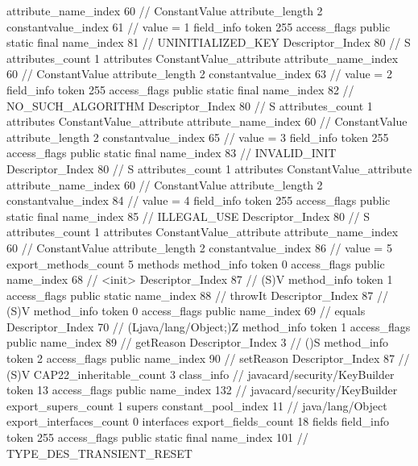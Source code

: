 {{{{{{{					attribute_name_index	60		// ConstantValue
					attribute_length	2
					constantvalue_index	61		// value = 1
				}
				}
			}
			field_info {
				token	255
				access_flags	public static final
				name_index	81		// UNINITIALIZED_KEY
				Descriptor_Index	80		// S
				attributes_count	1
				attributes {
				ConstantValue_attribute {
					attribute_name_index	60		// ConstantValue
					attribute_length	2
					constantvalue_index	63		// value = 2
				}
				}
			}
			field_info {
				token	255
				access_flags	public static final
				name_index	82		// NO_SUCH_ALGORITHM
				Descriptor_Index	80		// S
				attributes_count	1
				attributes {
				ConstantValue_attribute {
					attribute_name_index	60		// ConstantValue
					attribute_length	2
					constantvalue_index	65		// value = 3
				}
				}
			}
			field_info {
				token	255
				access_flags	public static final
				name_index	83		// INVALID_INIT
				Descriptor_Index	80		// S
				attributes_count	1
				attributes {
				ConstantValue_attribute {
					attribute_name_index	60		// ConstantValue
					attribute_length	2
					constantvalue_index	84		// value = 4
				}
				}
			}
			field_info {
				token	255
				access_flags	public static final
				name_index	85		// ILLEGAL_USE
				Descriptor_Index	80		// S
				attributes_count	1
				attributes {
				ConstantValue_attribute {
					attribute_name_index	60		// ConstantValue
					attribute_length	2
					constantvalue_index	86		// value = 5
				}
				}
			}
			}
			export_methods_count	5
			methods {
				method_info {
					token	0
					access_flags	public
					name_index	68		// <init>
					Descriptor_Index	87		// (S)V
				}
				method_info {
					token	1
					access_flags	public static
					name_index	88		// throwIt
					Descriptor_Index	87		// (S)V
				}
				method_info {
					token	0
					access_flags	public
					name_index	69		// equals
					Descriptor_Index	70		// (Ljava/lang/Object;)Z
				}
				method_info {
					token	1
					access_flags	public
					name_index	89		// getReason
					Descriptor_Index	3		// ()S
				}
				method_info {
					token	2
					access_flags	public
					name_index	90		// setReason
					Descriptor_Index	87		// (S)V
				}
			}
			CAP22_inheritable_count	3
		}
		class_info {		// javacard/security/KeyBuilder
			token	13
			access_flags	public
			name_index	132		// javacard/security/KeyBuilder
			export_supers_count	1
			supers {
				constant_pool_index	11		// java/lang/Object
			}
			export_interfaces_count	0
			interfaces {
			}
			export_fields_count	18
			fields {
			field_info {
				token	255
				access_flags	public static final
				name_index	101		// TYPE_DES_TRANSIENT_RESET
}}}}}
